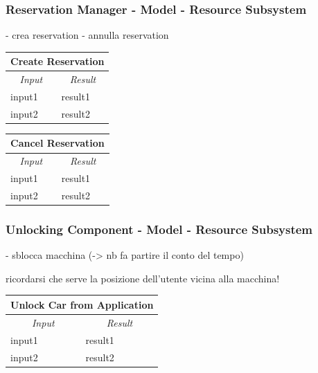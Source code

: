 \documentclass[english]{article}
\begin{document}
\subsubsection{Reservation Manager - Model - Resource Subsystem}
- crea reservation
- annulla reservation

\begin{center}

	\begin{tabular}{ | p{6cm} | p{6cm} | }
		\hline 


		\hline

		\multicolumn{2}{|c|}{\textbf{Create Reservation}} \\
		\hline
		\multicolumn{1}{|c|}{\textit{Input}} & \multicolumn{1}{c|}{\textit{Result}} \\
		\hline
		input1 & result1 \\
		\hline
		input2 & result2 \\
		\hline
	\end{tabular}
\end{center}

\begin{center}

	\begin{tabular}{ | p{6cm} | p{6cm} | }
		\hline 


		\hline

		\multicolumn{2}{|c|}{\textbf{Cancel Reservation}} \\
		\hline
		\multicolumn{1}{|c|}{\textit{Input}} & \multicolumn{1}{c|}{\textit{Result}} \\
		\hline
		input1 & result1 \\
		\hline
		input2 & result2 \\
		\hline
	\end{tabular}
\end{center}

\subsubsection{Unlocking Component - Model - Resource Subsystem}
- sblocca macchina (-> nb fa partire il conto del tempo)

ricordarsi che serve la posizione dell'utente vicina alla macchina!

\begin{center}

	\begin{tabular}{ | p{6cm} | p{6cm} | }
		\hline 


		\hline

		\multicolumn{2}{|c|}{\textbf{Unlock Car from Application}} \\
		\hline
		\multicolumn{1}{|c|}{\textit{Input}} & \multicolumn{1}{c|}{\textit{Result}} \\
		\hline
		input1 & result1 \\
		\hline
		input2 & result2 \\
		\hline
	\end{tabular}
\end{center}
\end{document}
